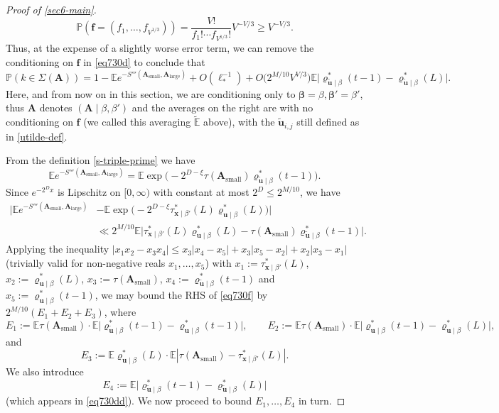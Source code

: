\documentclass[11pt,reqno]{amsart}
\numberwithin{equation}{section}
\theoremstyle{definition}
\theoremstyle{remark}
\newcommand{\mb}{\mathbb}
\newcommand{\mbf}{\mathbf}
\def\boldbeta{\boldsymbol\beta}
\renewcommand{\le}{\leqslant}
\renewcommand{\ge}{\geqslant}
\def\sml{\operatorname{small}}
\def\lrg{\operatorname{large}}
\begin{document}
\begin{proof}[Proof of \cref{sec6-main}]
\[ \mb{P}(\mbf{f} = (f_1,\dots, f_{V^{1/3}})) = \frac{V!}{f_1! \cdots f_{V^{1/3}}!} V^{-V/3} \ge V^{-V/3}.\] Thus, at the expense of a slightly worse error term, we can remove the conditioning on $\mbf{f}$ in \cref{eq730d} to conclude that 
\begin{equation}\label{eq730dd} \mb{P}(k \in \Sigma(\mbf{A})) =  1 - \mb{E} e^{-S'''(\mbf{A}_{\sml}, \mbf{A}_{\lrg})} + O(\ell_*^{-1}) + 
O \big( 2^{M/10}V^{V/3} \big)\mb{E} \big| \varrho^*_{\tilde{\mbf{u}} \mid \beta}(t-1) - \varrho^*_{\tilde{\mbf{u}} \mid \beta}(L)\big|.\end{equation}
Here, and from now on in this section, we are conditioning only to $\boldbeta = \beta, \boldbeta' = \beta'$, thus $\mbf{A}$ denotes $(\mbf{A} \mid \beta, \beta')$ and the averages on the right are with no conditioning on $\mbf{f}$ (we called this averaging $\tilde{\mb{E}}$ above), with the $\tilde{\mbf{u}}_{i,j}$ still defined as in \cref{utilde-def}.


From the definition \cref{s-triple-prime} we have
\[ \mb{E} e^{-S'''(\mbf{A}_{\sml}, \mbf{A}_{\lrg})} = \mb{E} \exp\big({-}2^{D- \xi}\tau(\mbf{A}_{\sml}) \varrho^*_{\tilde{\mbf{u}} \mid \beta}(t-1)\big).\]
Since $e^{-2^D x}$ is Lipschitz on $[0,\infty)$ with constant at most $2^D \le 2^{M/10}$, we have
\begin{align} \nonumber \big| \mb{E} e^{-S'''(\mbf{A}_{\sml}, \mbf{A}_{\lrg})} & - \mb{E} \exp \big(-2^{D - \xi} \tau^*_{\mbf{x} \mid \beta'}(L) \varrho^*_{\mbf{u} \mid \beta}(L)\big)\big| \\ &  \ll 2^{M/10}  \mb{E} \big| \tau^*_{\mbf{x} \mid \beta'}(L) \varrho^*_{\mbf{u} \mid \beta}(L) - \tau(\mbf{A}_{\sml})\varrho^*_{\tilde{\mbf{u}} \mid \beta}(t-1) \big| \label{eq730f}.\end{align} 
Applying the inequality  $|x_1 x_2 - x_3 x_4| \le x_3 |x_4 - x_5| + x_3 |x_5 - x_2| + x_2 |x_3 - x_1|$ (trivially valid for non-negative reals $x_1,\dots, x_5$) with $x_1 := \tau^*_{\mbf{x} \mid \beta'}(L)$, $x_2 := \varrho^*_{\mbf{u} \mid \beta}(L)$, $x_3 := \tau(\mbf{A}_{\sml})$, $x_4 := \varrho^*_{\tilde{\mbf{u}} \mid \beta}(t-1)$ and $x_5 := \varrho^*_{\mbf{u} \mid \beta}(t-1)$, we may bound the RHS of \cref{eq730f} by $2^{M/10} (E_1 + E_2 + E_3)$, where
\[  E_1 := \mb{E}  \tau(\mbf{A}_{\sml}) \cdot \mb{E} \big| \varrho^*_{\tilde{\mbf{u}} \mid \beta}(t-1) - \varrho^*_{\mbf{u} \mid \beta}(t-1)\big|, \qquad
 E_2 := \mb{E}  \tau(\mbf{A}_{\sml}) \cdot \mb{E} \big| \varrho^*_{\mbf{u} \mid \beta}(t-1) - \varrho^*_{\mbf{u} \mid \beta}(L)\big|,\] and
\[ E_3 := \mb{E} \varrho^*_{\mbf{u} \mid \beta}(L) \cdot \mb{E} | \tau(\mbf{A}_{\sml}) - \tau^*_{\mbf{x} \mid \beta'}(L) |.\]
We also introduce 
\[ E_4 := \mb{E} \big| \varrho^*_{\tilde{\mbf{u}} \mid \beta}(t-1) - \varrho^*_{\tilde{\mbf{u}} \mid \beta}(L)\big| \] (which appears in \cref{eq730dd}). We now proceed to bound $E_1,\dots, E_4$ in turn.\vspace*{8pt}


\end{proof}
\end{document}
